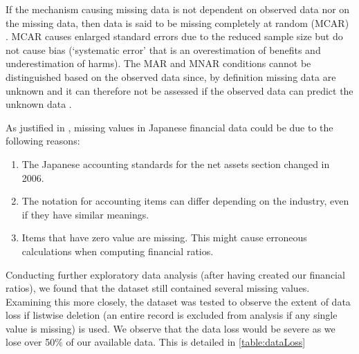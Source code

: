 If the mechanism causing missing data is not dependent on observed data nor on the missing data, then data is said to be missing completely at random (MCAR) \cite{sterne2009multiple,dziura2013strategies}. MCAR causes enlarged standard errors due to the reduced sample size but do not cause bias (‘systematic error’ that is an overestimation of benefits and underestimation of harms). 
The MAR and MNAR conditions cannot be distinguished based on the observed data since,  by definition missing data are unknown and it can therefore not be assessed if the observed data can predict the unknown data \cite{sterne2009multiple,dziura2013strategies}.


As justified in \cite{hosaka2019bankruptcy}, missing values in Japanese financial data could be due to the following reasons:
\begin{enumerate}
    \item The Japanese accounting standards for the net assets section changed in 2006.
    \item The notation for accounting items can differ depending on the industry, even if they have similar meanings.
    \item Items that have zero value are missing. This might cause erroneous calculations when computing financial ratios.
\end{enumerate}

Conducting further exploratory data analysis (after having created our financial ratios), we found that the dataset still contained several missing values. Examining this more closely, the dataset was tested to observe the extent of data loss if listwise deletion (an entire record is excluded from analysis if any single value is missing) is used. We observe that the data loss would be severe as we lose over 50\% of our available data. This is detailed in \autoref{table:dataLoss}

